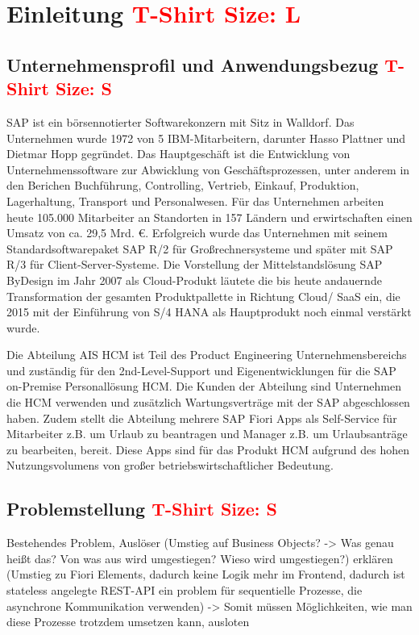 \chapter{Einleitung \textcolor{red}{T-Shirt Size: L}}

\section{Unternehmensprofil und Anwendungsbezug \textcolor{red}{T-Shirt Size: S}}

SAP ist ein börsennotierter Softwarekonzern mit Sitz in Walldorf. Das Unternehmen wurde 1972 von 5 IBM-Mitarbeitern, darunter Hasso Plattner und Dietmar Hopp gegründet. Das Hauptgeschäft ist die Entwicklung von Unternehmenssoftware zur Abwicklung von Geschäftsprozessen, unter anderem in den Berichen Buchführung, Controlling, Vertrieb, Einkauf, Produktion, Lagerhaltung, Transport und Personalwesen. Für das Unternehmen arbeiten heute 105.000 Mitarbeiter an Standorten in 157 Ländern und erwirtschaften einen Umsatz von ca. 29,5 Mrd. \euro{}. Erfolgreich wurde das Unternehmen mit seinem Standardsoftwarepaket SAP R/2 für Gro{\ss}rechnersysteme und später mit SAP R/3 für Client-Server-Systeme. Die Vorstellung der Mittelstandslösung SAP ByDesign im Jahr 2007 als Cloud-Produkt läutete die bis heute andauernde Transformation der gesamten Produktpallette in Richtung Cloud/ SaaS ein, die 2015 mit der Einführung von S/4 HANA als Hauptprodukt noch einmal verstärkt wurde.

Die Abteilung AIS HCM ist Teil des Product Engineering Unternehmensbereichs und zuständig für den 2nd-Level-Support und Eigenentwicklungen für die SAP on-Premise Personallösung HCM. Die Kunden der Abteilung sind Unternehmen die HCM verwenden und zusätzlich Wartungsverträge mit der SAP abgeschlossen haben. Zudem stellt die Abteilung mehrere SAP Fiori Apps als Self-Service für Mitarbeiter z.B. um Urlaub zu beantragen und Manager z.B. um Urlaubsanträge zu bearbeiten, bereit. Diese Apps sind für das Produkt HCM aufgrund des hohen Nutzungsvolumens von gro{\ss}er betriebswirtschaftlicher Bedeutung.

\section{Problemstellung \textcolor{red}{T-Shirt Size: S}}

Bestehendes Problem, Auslöser (Umstieg auf Business Objects? -> Was genau heißt das? Von was aus wird umgestiegen? Wieso wird umgestiegen?) erklären (Umstieg zu Fiori Elements, dadurch keine Logik mehr im Frontend, dadurch ist stateless angelegte REST-API ein problem für sequentielle Prozesse, die asynchrone Kommunikation verwenden)
-> Somit müssen Möglichkeiten, wie man diese Prozesse trotzdem umsetzen kann, ausloten

